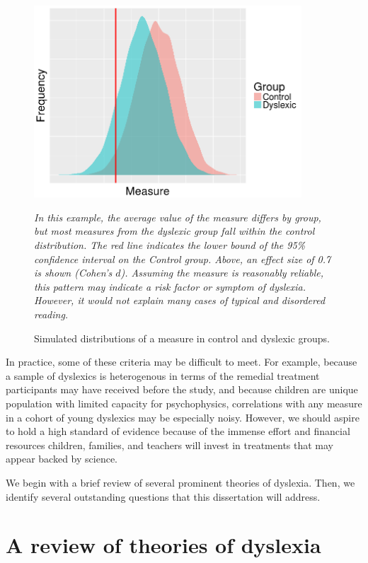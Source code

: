 \documentclass[../uwthesis.tex]{subfiles}
\begin{document}
\begin{figure}
    \centering
    \caption{Simulated distributions of a measure in control and dyslexic groups.}
    \label{fig:intro_fig2.png}
    \includegraphics[width=10cm]{images/intro/intro_fig2.png}
    \item \textit{In this example, the
    average value of the measure differs by group, but most measures from the dyslexic group fall within the control distribution. The red line indicates the lower bound of the 95\% confidence interval on the Control group. Above, an effect size of 0.7 is shown (Cohen’s $d$). Assuming the measure is reasonably reliable, this pattern may indicate a risk factor or symptom of dyslexia. However, it would not explain many cases of typical and disordered reading.}
\end{figure}

In practice, some of these criteria may be difficult to meet. For example, because a sample of dyslexics is heterogenous in terms of the remedial treatment participants may have received before the study, and because children are unique population with limited capacity for psychophysics, correlations with any measure in a cohort of young dyslexics may be especially noisy. However, we should aspire to hold a high standard of evidence because of the immense effort and financial resources children, families, and teachers will invest in treatments that may appear backed by science.

We begin with a brief review of several prominent theories of dyslexia. Then, we identify several outstanding questions that this dissertation will address. 

\section{A review of theories of dyslexia}
\end{document}
